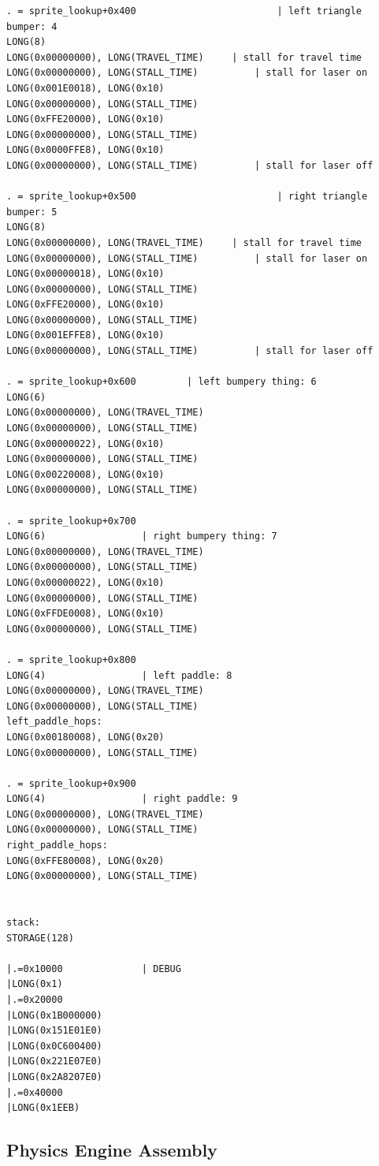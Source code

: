 \documentclass{article}
\begin{document}
\begin{lstlisting}
. = sprite_lookup+0x400							| left triangle bumper: 4
LONG(8)
LONG(0x00000000), LONG(TRAVEL_TIME)    	| stall for travel time
LONG(0x00000000), LONG(STALL_TIME)    		| stall for laser on
LONG(0x001E0018), LONG(0x10)
LONG(0x00000000), LONG(STALL_TIME)
LONG(0xFFE20000), LONG(0x10)
LONG(0x00000000), LONG(STALL_TIME)
LONG(0x0000FFE8), LONG(0x10)
LONG(0x00000000), LONG(STALL_TIME)    		| stall for laser off

. = sprite_lookup+0x500							| right triangle bumper: 5
LONG(8)
LONG(0x00000000), LONG(TRAVEL_TIME)    	| stall for travel time
LONG(0x00000000), LONG(STALL_TIME)    		| stall for laser on
LONG(0x00000018), LONG(0x10)
LONG(0x00000000), LONG(STALL_TIME)
LONG(0xFFE20000), LONG(0x10)
LONG(0x00000000), LONG(STALL_TIME)
LONG(0x001EFFE8), LONG(0x10)
LONG(0x00000000), LONG(STALL_TIME)    		| stall for laser off

. = sprite_lookup+0x600			| left bumpery thing: 6
LONG(6)
LONG(0x00000000), LONG(TRAVEL_TIME)
LONG(0x00000000), LONG(STALL_TIME)
LONG(0x00000022), LONG(0x10)
LONG(0x00000000), LONG(STALL_TIME)
LONG(0x00220008), LONG(0x10)
LONG(0x00000000), LONG(STALL_TIME)

. = sprite_lookup+0x700
LONG(6)					| right bumpery thing: 7
LONG(0x00000000), LONG(TRAVEL_TIME)
LONG(0x00000000), LONG(STALL_TIME)
LONG(0x00000022), LONG(0x10)
LONG(0x00000000), LONG(STALL_TIME)
LONG(0xFFDE0008), LONG(0x10)
LONG(0x00000000), LONG(STALL_TIME)

. = sprite_lookup+0x800
LONG(4)					| left paddle: 8
LONG(0x00000000), LONG(TRAVEL_TIME)
LONG(0x00000000), LONG(STALL_TIME)
left_paddle_hops:
LONG(0x00180008), LONG(0x20)
LONG(0x00000000), LONG(STALL_TIME)

. = sprite_lookup+0x900
LONG(4)					| right paddle: 9
LONG(0x00000000), LONG(TRAVEL_TIME)
LONG(0x00000000), LONG(STALL_TIME)
right_paddle_hops:
LONG(0xFFE80008), LONG(0x20)
LONG(0x00000000), LONG(STALL_TIME)


stack:
STORAGE(128)

|.=0x10000				| DEBUG
|LONG(0x1)
|.=0x20000
|LONG(0x1B000000)
|LONG(0x151E01E0)
|LONG(0x0C600400)
|LONG(0x221E07E0)
|LONG(0x2A8207E0)
|.=0x40000
|LONG(0x1EEB)
\end{lstlisting}

\subsection{Physics Engine Assembly}
\end{document}
